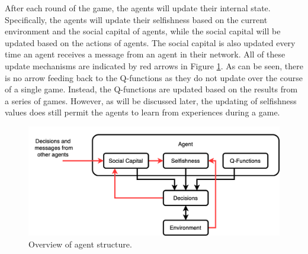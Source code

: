 After each round of the game, the agents will update their internal state. Specifically, the agents will update their selfishness based on the current environment and the social capital of agents, while the social capital will be updated based on the actions of agents. The social capital is also updated every time an agent receives a message from an agent in their network. All of these update mechanisms are indicated by red arrows in Figure \ref{fig:agent_structure}. As can be seen, there is no arrow feeding back to the Q-functions as they do not update over the course of a single game. Instead, the Q-functions are updated based on the results from a series of games. However, as will be discussed later, the updating of selfishness values does still permit the agents to learn from experiences during a game.


\begin{figure}[!h]
    \centering
    \includegraphics[width=0.75\linewidth]{004_team_1_agent_design/images/agent_structure.png}
    \caption{Overview of agent structure.}
    \label{fig:agent_structure}
\end{figure}

